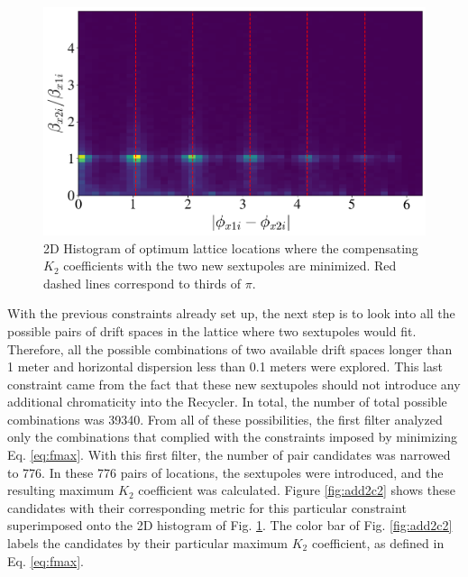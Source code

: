 \begin{figure}[H]
    \centering
    \includegraphics[width=\columnwidth]{chapter4/constrain1.png}
    \caption{2D Histogram of optimum lattice locations where the compensating $K_2$ coefficients with the two new sextupoles are minimized. Red dashed lines correspond to thirds of $\pi$.}
    \label{fig:add2c1}
\end{figure}

With the previous constraints already set up, the next step is to look into all the possible pairs of drift spaces in the lattice where two sextupoles would fit. Therefore, all the possible combinations of two available drift spaces longer than 1 meter and horizontal dispersion less than 0.1 meters were explored. This last constraint came from the fact that these new sextupoles should not introduce any additional chromaticity into the Recycler. In total, the number of total possible combinations was 39340. From all of these possibilities, the first filter analyzed only the combinations that complied with the constraints imposed by minimizing Eq. \ref{eq:fmax}. With this first filter, the number of pair candidates was narrowed to 776. In these 776 pairs of locations, the sextupoles were introduced, and the resulting maximum $K_2$ coefficient was calculated. Figure \ref{fig:add2c2} shows these candidates with their corresponding metric for this particular constraint superimposed onto the 2D histogram of Fig. \ref{fig:add2c1}. The color bar of Fig. \ref{fig:add2c2} labels the candidates by their particular maximum $K_2$ coefficient, as defined in Eq. \ref{eq:fmax}.

